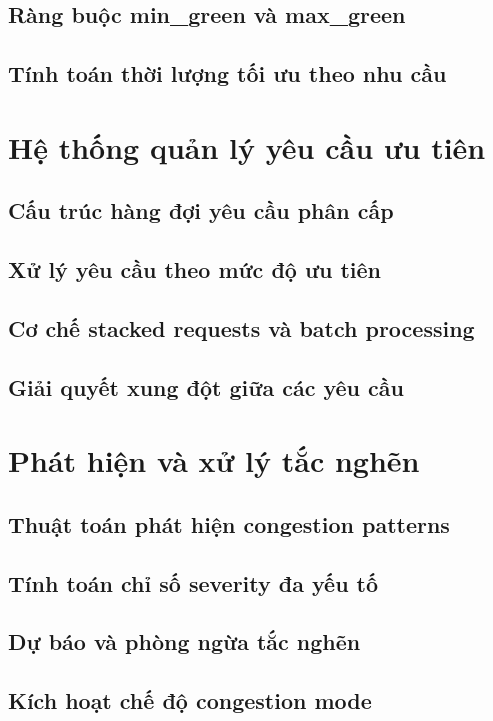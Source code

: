 \subsection{Ràng buộc min_green và max_green}
\subsection{Tính toán thời lượng tối ưu theo nhu cầu}

\section{Hệ thống quản lý yêu cầu ưu tiên}
\subsection{Cấu trúc hàng đợi yêu cầu phân cấp}
\subsection{Xử lý yêu cầu theo mức độ ưu tiên}
\subsection{Cơ chế stacked requests và batch processing}
\subsection{Giải quyết xung đột giữa các yêu cầu}

\section{Phát hiện và xử lý tắc nghẽn}
\subsection{Thuật toán phát hiện congestion patterns}
\subsection{Tính toán chỉ số severity đa yếu tố}
\subsection{Dự báo và phòng ngừa tắc nghẽn}
\subsection{Kích hoạt chế độ congestion mode}

